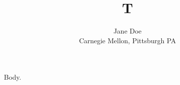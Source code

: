 \documentclass{article}
\title{T}
\author{Jane Doe\\ Carnegie Mellon, Pittsburgh PA}
\begin{document}
\maketitle
Body.
\end{document}

